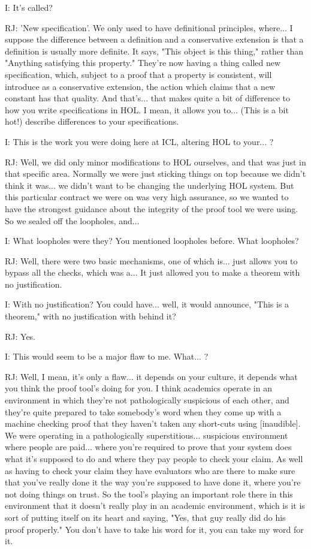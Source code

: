 \documentclass[10pt,titlepage]{book}
\begin{document}
I: It's called?

RJ: 'New specification'.
We only used to have definitional principles, where... I suppose the difference between a definition and a conservative extension is that a definition is usually more definite.
It says, "This object is this thing," rather than "Anything satisfying this property."
They're now having a thing called new specification, which, subject to a proof that a property is consistent, will introduce as a conservative extension, the action which claims that a new constant has that quality.
And that's... that makes quite a bit of difference to how you write specifications in HOL. I mean, it allows you to... (This is a bit hot!) describe differences to your specifications.

I: This is the work you were doing here at ICL, altering HOL to your... ?

RJ: Well, we did only minor modifications to HOL ourselves, and that was just in that specific area. Normally we were just sticking things on top because we didn't think it was... we didn't want to be changing the underlying HOL system. But this particular contract we were on was very high assurance, so we wanted to have the strongest guidance about the integrity of the proof tool we were using. So we sealed off the loopholes, and... 

I: What loopholes were they? You mentioned loopholes before. What loopholes?

RJ: Well, there were two basic mechanisms, one of which is... just allows you to bypass all the checks, which was a... It just allowed you to make a theorem with no justification.

I: With no justification? You could have... well, it would announce, "This is a theorem," with no justification with behind it?

RJ: Yes.

I: This would seem to be a major flaw to me. What... ?

RJ: Well, I mean, it's only a flaw... it depends on your culture, it depends what you think the proof tool's doing for you. I think academics operate in an environment in which they're not pathologically suspicious of each other, and they're quite prepared to take somebody's word when they come up with a machine checking proof that they haven't taken any short-cuts using [inaudible]. We were operating in a pathologically superstitious... suspicious environment where people are paid... where you're required to prove that your system does what it's supposed to do and where they pay people to check your claim. As well as having to check your claim they have evaluators who are there to make sure that you've really done it the way you're supposed to have done it, where you're not doing things on trust. So the tool's playing an important role there in this environment that it doesn't really play in an academic environment, which is it is sort of putting itself on its heart and saying, "Yes, that guy really did do his proof properly." You don't have to take his word for it, you can take my word for it.
\end{document}
